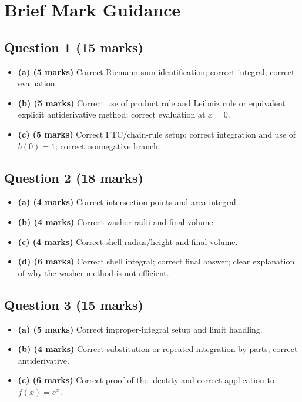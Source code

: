 \documentclass[12pt]{article}
\begin{document}
\newpage

\section{Brief Mark Guidance}

\subsection{Question 1 \hfill (15 marks)}
\begin{itemize}[leftmargin=1.6em]
\item \textbf{(a) (5 marks)} Correct Riemann-sum identification; correct integral; correct evaluation.
\item \textbf{(b) (5 marks)} Correct use of product rule and Leibniz rule or equivalent explicit antiderivative method; correct evaluation at \(x=0\).
\item \textbf{(c) (5 marks)} Correct FTC/chain-rule setup; correct integration and use of \(b(0)=1\); correct nonnegative branch.
\end{itemize}

\subsection{Question 2 \hfill (18 marks)}
\begin{itemize}[leftmargin=1.6em]
\item \textbf{(a) (4 marks)} Correct intersection points and area integral.
\item \textbf{(b) (4 marks)} Correct washer radii and final volume.
\item \textbf{(c) (4 marks)} Correct shell radius/height and final volume.
\item \textbf{(d) (6 marks)} Correct shell integral; correct final answer; clear explanation of why the washer method is not efficient.
\end{itemize}

\subsection{Question 3 \hfill (15 marks)}
\begin{itemize}[leftmargin=1.6em]
\item \textbf{(a) (5 marks)} Correct improper-integral setup and limit handling.
\item \textbf{(b) (4 marks)} Correct substitution or repeated integration by parts; correct antiderivative.
\item \textbf{(c) (6 marks)} Correct proof of the identity and correct application to \(f(x)=e^x\).
\end{itemize}
\end{document}
